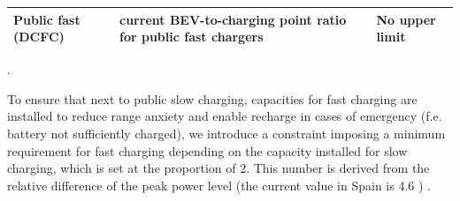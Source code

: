 \documentclass[preprint,review,11pt, authoryear]{elsarticle}
\begin{document}
\begin{table}[H]
{\begin{tabular}{lll}
            Public fast (DCFC)                            & current BEV-to-charging point ratio for public fast chargers \citep{eafo2024ev, eurostatZEV}                                  & No upper limit                                                                                                                                                                                                                                                               \\ \hline
            \end{tabular}%
            }
            \end{table}

            .  

            To ensure that next to public slow charging, capacities for fast charging are installed to reduce range anxiety and enable recharge in cases of emergency (f.e. battery not sufficiently charged), we introduce a constraint imposing a minimum requirement for fast charging depending on the capacity installed for slow charging, which is set at the proportion of 2. This number is derived from the relative difference of the peak power level (the current value in Spain is 4.6 \citep{eafo2024ev}) .
    
\end{document}
